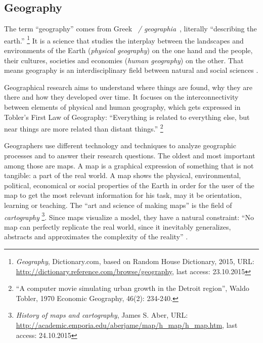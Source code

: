 
\subsection{Geography} %
\label{sub:geography}


The term ``geography'' comes from Greek ~\emph{\textgamma\textepsilon\textomega\textgamma\textrho\textalpha\textphi\textiota\textalpha / geographia}~, literally ``describing the earth.''
\footnote{
  \textit{Geography},
  Dictionary.com, based on Random House Dictionary, 2015,
  URL: \url{http://dictionary.reference.com/browse/geography},
  last access: 23.10.2015
}
It is a science that studies the interplay between the landscapes and environments of the Earth (\emph{physical geography}) on the one hand and the people, their cultures, societies and economies (\emph{human geography}) on the other. That means geography is an interdisciplinary field between natural and social sciences
\cite{rgsGeography}.

Geographical research aims to understand where things are found, why they are there and how they developed over time.
It focuses on the interconnectivity between elements of physical and human geography, which gets expressed in Tobler's First Law of Geography: ``Everything is related to everything else, but near things are more related than distant things.''
\footnote{
  ``A computer movie simulating urban growth in the Detroit region'',
  Waldo Tobler, 1970
  Economic Geography, 46(2): 234-240.
}

Geographers use different technology and techniques to analyze geographic processes and to answer their research questions. The oldest and most important among those are maps. A map is a graphical expression of something that is not tangible: a part of the real world. A map shows the physical, environmental, political, economical or social properties of the Earth in order for the user of the map to get the most relevant information for his task, may it be orientation, learning or teaching. The ``art and science of making maps'' is the field of \emph{cartography}
\footnote{
  \textit{History of maps and cartography},
  James S. Aber,
  URL: \url{http://academic.emporia.edu/aberjame/map/h_map/h_map.htm},
  last access: 24.10.2015
}. Since maps visualize a model, they have a natural constraint: ``No map can perfectly replicate the real world, since it inevitably generalizes, abstracts and approximates the complexity of the reality''
\cite[p. 181]{knowles2008placing}.

